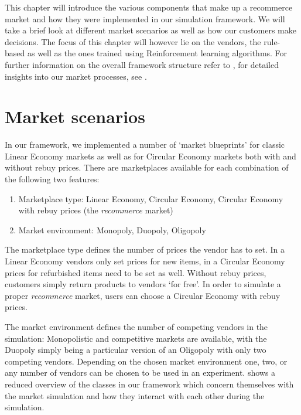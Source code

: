 \begin{jointwork}\label{ch:SimulatingMarketplace}
	This chapter will introduce the various components that make up a recommerce market and how they were implemented in our simulation framework. We will take a brief look at different market scenarios as well as how our customers make decisions. The focus of this chapter will however lie on the vendors, the rule-based as well as the ones trained using Reinforcement learning algorithms. For further information on the overall framework structure refer to \cite{LeoThesis}, for detailed insights into our market processes, see \cite{NickThesis}.
\end{jointwork}

\section{Market scenarios}\label{sec:MarketScenarios}

In our framework, we implemented a number of `market blueprints' for classic Linear Economy markets as well as for Circular Economy markets both with and without rebuy prices. There are marketplaces available for each combination of the following two features:
\begin{enumerate}
	\item Marketplace type: Linear Economy, Circular Economy, Circular Economy with rebuy prices (the \emph{recommerce} market)
	\item Market environment: Monopoly, Duopoly, Oligopoly
\end{enumerate}
The marketplace type defines the number of prices the vendor has to set. In a Linear Economy vendors only set prices for new items, in a Circular Economy prices for refurbished items need to be set as well. Without rebuy prices, customers simply return products to vendors `for free'. In order to simulate a proper \emph{recommerce} market, users can choose a Circular Economy with rebuy prices.

The market environment defines the number of competing vendors in the simulation: Monopolistic and competitive markets are available, with the Duopoly simply being a particular version of an Oligopoly with only two competing vendors. Depending on the chosen market environment one, two, or any number of vendors can be chosen to be used in an experiment.  shows a reduced overview of the classes in our framework which concern themselves with the market simulation and how they interact with each other during the simulation.

